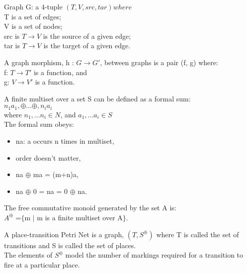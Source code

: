 \begin{definition}
\label{def:Graph}
Graph G: a 4-tuple $(T, V, src, tar) where $\\ 
T is a set of edges; \\
V is a set of nodes;\\
src is $T \rightarrow V$ is the source of a given edge;\\
tar is $T \rightarrow V$ is the target of a given edge.\\
\end{definition}
%
\begin{definition}
\label{def:Graph-Morphism}
A graph morphism, h : $G \rightarrow G'$, between graphs is a  pair (f, g) where:\\
f: $T \rightarrow T'$ is a function, and\\
g: $V \rightarrow V'$ is a function.\\
\end{definition}
%
\begin{definition}
\label{def:Finite-Multiset}
A finite multiset over a set S can be defined as a formal sum:\\
$n_1a_1, \oplus ... \oplus, n_ia_i$\\
where $n_1, ... n_i \in N$, and $a_1, ... a_i \in S$\\
The formal sum obeys:
\begin{itemize}
\setlength\itemsep{.1em}
\item na: a occurs n times in multiset,
\item order doesn't matter,
\item na $\oplus$ ma = (m+n)a,
\item na $\oplus$ 0 = na = 0 $\oplus$ na.
\end{itemize}
\end{definition}
%
\begin{definition}
\label{def:Free-Commutative-Monoid}
The free commutative monoid generated by the set A is:\\
$A^\oplus$ =$\{$m $|$ m is a finite multiset over A$\}$.\\
\end{definition}
%
\begin{definition}
\label{place-transition-petri-net}
A place-transition Petri Net is a graph, $(T, S^\oplus)$ where T is called the set of transitions and S is called the set of places.\\
The elements of $S^\oplus$ model the number of markings required for a transition to fire at a particular place.\\
\end{definition}

